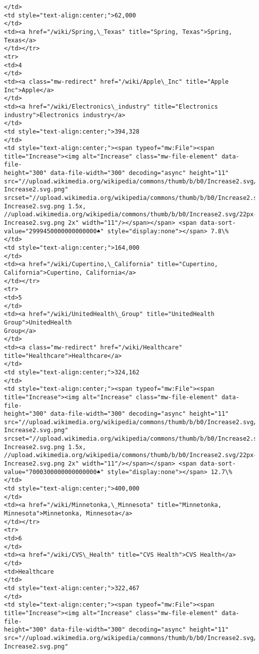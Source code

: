 \documentclass[11pt]{article}
\begin{document}
\begin{Verbatim}[commandchars=\\\{\}]
</td>
<td style="text-align:center;">62,000
</td>
<td><a href="/wiki/Spring,\_Texas" title="Spring, Texas">Spring, Texas</a>
</td></tr>
<tr>
<td>4
</td>
<td><a class="mw-redirect" href="/wiki/Apple\_Inc" title="Apple Inc">Apple</a>
</td>
<td><a href="/wiki/Electronics\_industry" title="Electronics
industry">Electronics industry</a>
</td>
<td style="text-align:center;">394,328
</td>
<td style="text-align:center;"><span typeof="mw:File"><span
title="Increase"><img alt="Increase" class="mw-file-element" data-file-
height="300" data-file-width="300" decoding="async" height="11"
src="//upload.wikimedia.org/wikipedia/commons/thumb/b/b0/Increase2.svg/11px-
Increase2.svg.png"
srcset="//upload.wikimedia.org/wikipedia/commons/thumb/b/b0/Increase2.svg/17px-
Increase2.svg.png 1.5x,
//upload.wikimedia.org/wikipedia/commons/thumb/b/b0/Increase2.svg/22px-
Increase2.svg.png 2x" width="11"/></span></span> <span data-sort-
value="2999450000000000000♠" style="display:none"></span> 7.8\%
</td>
<td style="text-align:center;">164,000
</td>
<td><a href="/wiki/Cupertino,\_California" title="Cupertino,
California">Cupertino, California</a>
</td></tr>
<tr>
<td>5
</td>
<td><a href="/wiki/UnitedHealth\_Group" title="UnitedHealth Group">UnitedHealth
Group</a>
</td>
<td><a class="mw-redirect" href="/wiki/Healthcare"
title="Healthcare">Healthcare</a>
</td>
<td style="text-align:center;">324,162
</td>
<td style="text-align:center;"><span typeof="mw:File"><span
title="Increase"><img alt="Increase" class="mw-file-element" data-file-
height="300" data-file-width="300" decoding="async" height="11"
src="//upload.wikimedia.org/wikipedia/commons/thumb/b/b0/Increase2.svg/11px-
Increase2.svg.png"
srcset="//upload.wikimedia.org/wikipedia/commons/thumb/b/b0/Increase2.svg/17px-
Increase2.svg.png 1.5x,
//upload.wikimedia.org/wikipedia/commons/thumb/b/b0/Increase2.svg/22px-
Increase2.svg.png 2x" width="11"/></span></span> <span data-sort-
value="7000300000000000000♠" style="display:none"></span> 12.7\%
</td>
<td style="text-align:center;">400,000
</td>
<td><a href="/wiki/Minnetonka,\_Minnesota" title="Minnetonka,
Minnesota">Minnetonka, Minnesota</a>
</td></tr>
<tr>
<td>6
</td>
<td><a href="/wiki/CVS\_Health" title="CVS Health">CVS Health</a>
</td>
<td>Healthcare
</td>
<td style="text-align:center;">322,467
</td>
<td style="text-align:center;"><span typeof="mw:File"><span
title="Increase"><img alt="Increase" class="mw-file-element" data-file-
height="300" data-file-width="300" decoding="async" height="11"
src="//upload.wikimedia.org/wikipedia/commons/thumb/b/b0/Increase2.svg/11px-
Increase2.svg.png"

\end{Verbatim}
\end{document}
